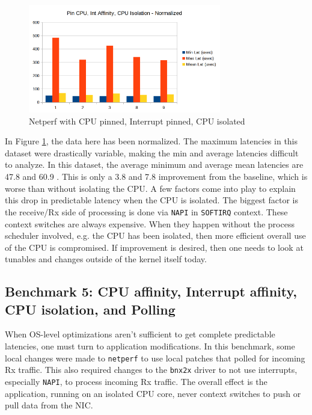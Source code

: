 \documentclass[letterpaper]{article}
\begin{document}
{{\begin{figure}[h]
\includegraphics[width=3.31in]{netperf-cpu-pin-int-affinity-cpu-isol-normalized.png}
\caption{Netperf with CPU pinned, Interrupt pinned, CPU isolated}
\label{netperf-cpu-pin-int-affinity-cpu-isol-normalized}
\end{figure}

In Figure \ref{netperf-cpu-pin-int-affinity-cpu-isol-normalized}, the data here has been normalized. The maximum latencies in this dataset were drastically variable, making the min and average latencies difficult to analyze.  In this dataset, the average minimum and average mean latencies are 47.8  and 60.9 .  This is only a 3.8  and 7.8  improvement from the baseline, which is worse than without isolating the CPU.
\newline
\newline
A few factors come into play to explain this drop in predictable latency when the CPU is isolated. The biggest factor is the receive/Rx side of processing is done via {\small \texttt{NAPI}} in {\small \texttt{SOFTIRQ}} context. These context switches are always expensive.  When they happen without the process scheduler involved, e.g. the CPU has been isolated, then more efficient overall use of the CPU is compromised. If improvement is desired, then one needs to look at tunables and changes outside of the kernel itself today.

\subsection{Benchmark 5: CPU affinity, Interrupt affinity, CPU isolation, and Polling}
When OS-level optimizations aren't sufficient to get complete predictable latencies, one must turn to application modifications. In this benchmark, some local changes were made to {\small \texttt{netperf}} to use local patches that polled for incoming Rx traffic. This also required changes to the {\small \texttt{bnx2x}} driver to not use interrupts, especially {\small \texttt{NAPI}}, to process incoming Rx traffic. The overall effect is the application, running on an isolated CPU core, never context switches to push or pull data from the NIC.

}}
\end{document}
